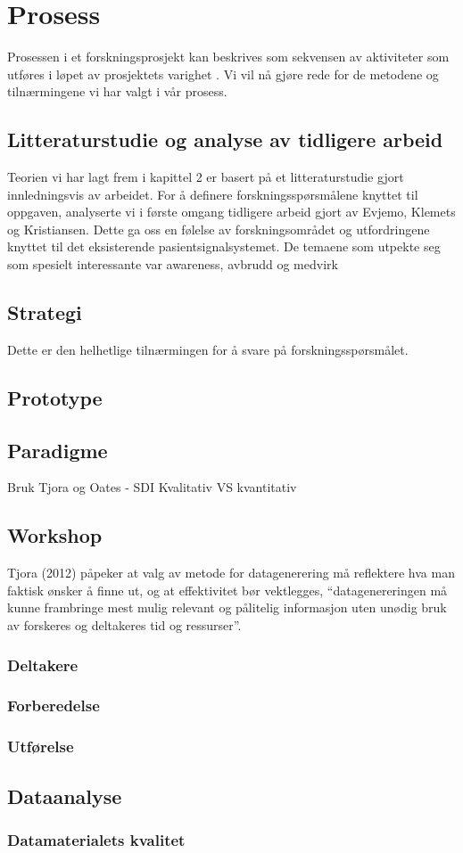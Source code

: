\section{Prosess}
\label{chp: prosess}

Prosessen i et forskningsprosjekt kan beskrives som sekvensen av aktiviteter som utføres i løpet av prosjektets varighet \cite{Oates}. Vi vil nå gjøre rede for de metodene og tilnærmingene vi har valgt i vår prosess.

\subsection{Litteraturstudie og analyse av tidligere arbeid}
Teorien vi har lagt frem i kapittel 2 er basert på et litteraturstudie gjort innledningsvis av arbeidet. For å definere forskningsspørsmålene knyttet til oppgaven, analyserte vi i første omgang tidligere arbeid gjort av Evjemo, Klemets og Kristiansen. Dette ga oss en følelse av forskningsområdet og utfordringene knyttet til det eksisterende pasientsignalsystemet. 
De temaene som utpekte seg som spesielt interessante var awareness, avbrudd og medvirk
	
\subsection{Strategi}
Dette er den helhetlige tilnærmingen for å svare på forskningsspørsmålet. 

\subsection{Prototype}


\subsection{Paradigme}
Bruk Tjora og Oates - SDI
Kvalitativ VS kvantitativ

\subsection{Workshop}
Tjora (2012) påpeker at valg av metode for datagenerering må reflektere hva man faktisk ønsker å finne ut, og at effektivitet bør vektlegges, “datagenereringen må kunne frambringe mest mulig relevant og pålitelig informasjon uten unødig bruk av forskeres og deltakeres tid og ressurser”.

\subsubsection{Deltakere}
\subsubsection{Forberedelse}
\subsubsection{Utførelse}

\subsection{Dataanalyse}

\subsubsection{Datamaterialets kvalitet}


